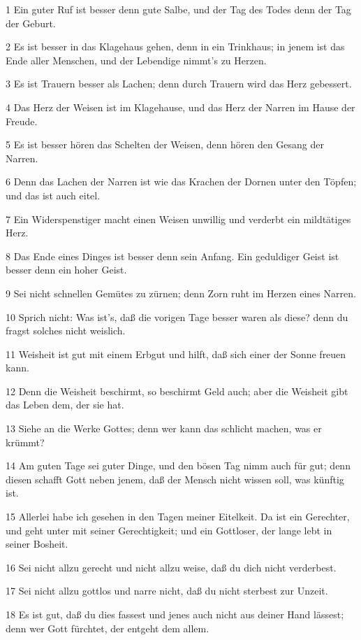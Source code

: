 \par 1 Ein guter Ruf ist besser denn gute Salbe, und der Tag des Todes denn der Tag der Geburt.
\par 2 Es ist besser in das Klagehaus gehen, denn in ein Trinkhaus; in jenem ist das Ende aller Menschen, und der Lebendige nimmt's zu Herzen.
\par 3 Es ist Trauern besser als Lachen; denn durch Trauern wird das Herz gebessert.
\par 4 Das Herz der Weisen ist im Klagehause, und das Herz der Narren im Hause der Freude.
\par 5 Es ist besser hören das Schelten der Weisen, denn hören den Gesang der Narren.
\par 6 Denn das Lachen der Narren ist wie das Krachen der Dornen unter den Töpfen; und das ist auch eitel.
\par 7 Ein Widerspenstiger macht einen Weisen unwillig und verderbt ein mildtätiges Herz.
\par 8 Das Ende eines Dinges ist besser denn sein Anfang. Ein geduldiger Geist ist besser denn ein hoher Geist.
\par 9 Sei nicht schnellen Gemütes zu zürnen; denn Zorn ruht im Herzen eines Narren.
\par 10 Sprich nicht: Was ist's, daß die vorigen Tage besser waren als diese? denn du fragst solches nicht weislich.
\par 11 Weisheit ist gut mit einem Erbgut und hilft, daß sich einer der Sonne freuen kann.
\par 12 Denn die Weisheit beschirmt, so beschirmt Geld auch; aber die Weisheit gibt das Leben dem, der sie hat.
\par 13 Siehe an die Werke Gottes; denn wer kann das schlicht machen, was er krümmt?
\par 14 Am guten Tage sei guter Dinge, und den bösen Tag nimm auch für gut; denn diesen schafft Gott neben jenem, daß der Mensch nicht wissen soll, was künftig ist.
\par 15 Allerlei habe ich gesehen in den Tagen meiner Eitelkeit. Da ist ein Gerechter, und geht unter mit seiner Gerechtigkeit; und ein Gottloser, der lange lebt in seiner Bosheit.
\par 16 Sei nicht allzu gerecht und nicht allzu weise, daß du dich nicht verderbest.
\par 17 Sei nicht allzu gottlos und narre nicht, daß du nicht sterbest zur Unzeit.
\par 18 Es ist gut, daß du dies fassest und jenes auch nicht aus deiner Hand lässest; denn wer Gott fürchtet, der entgeht dem allem.
